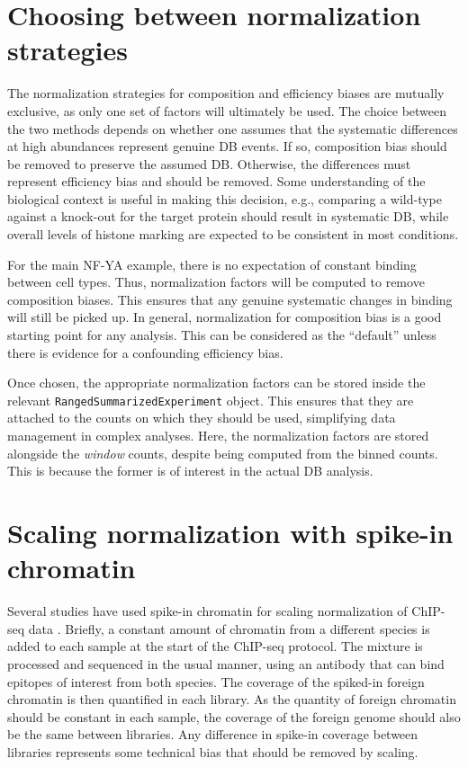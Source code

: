 \documentclass[12pt]{report}
\renewenvironment{Schunk}{\vspace{0pt}}{\vspace{0pt}}
\newcommand{\code}[1]{{\small\texttt{#1}}}
\begin{document}
\section{Choosing between normalization strategies}
The normalization strategies for composition and efficiency biases are mutually exclusive, as only one set of factors will ultimately be used.
The choice between the two methods depends on whether one assumes that the systematic differences at high abundances represent genuine DB events.
If so, composition bias should be removed to preserve the assumed DB.
Otherwise, the differences must represent efficiency bias and should be removed.
Some understanding of the biological context is useful in making this decision, e.g., comparing a wild-type against a knock-out for the target protein should result in systematic DB, while overall levels of histone marking are expected to be consistent in most conditions.

For the main NF-YA example, there is no expectation of constant binding between cell types.
Thus, normalization factors will be computed to remove composition biases.
This ensures that any genuine systematic changes in binding will still be picked up.
In general, normalization for composition bias is a good starting point for any analysis.
This can be considered as the ``default'' unless there is evidence for a confounding efficiency bias.

Once chosen, the appropriate normalization factors can be stored inside the relevant \code{RangedSummarizedExperiment} object.
This ensures that they are attached to the counts on which they should be used, simplifying data management in complex analyses.
Here, the normalization factors are stored alongside the \textit{window} counts, despite being computed from the binned counts.
This is because the former is of interest in the actual DB analysis.

\begin{Schunk}
\end{Schunk}

\section{Scaling normalization with spike-in chromatin}
Several studies have used spike-in chromatin for scaling normalization of ChIP-seq data \citep{bonhoure2014quantifying,orlando2014quantitative}.
Briefly, a constant amount of chromatin from a different species is added to each sample at the start of the ChIP-seq protocol.
The mixture is processed and sequenced in the usual manner, using an antibody that can bind epitopes of interest from both species.
The coverage of the spiked-in foreign chromatin is then quantified in each library.
As the quantity of foreign chromatin should be constant in each sample, the coverage of the foreign genome should also be the same between libraries.
Any difference in spike-in coverage between libraries represents some technical bias that should be removed by scaling.
\end{document}

